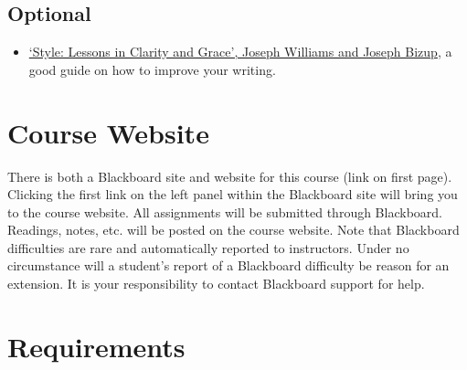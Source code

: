 \documentclass[article,oneside]{memoir}
\begin{document}
\subsection{Optional}

\begin{itemize}

\item \href{http://www.amazon.com/Style-Lessons-Clarity-Grace-11th/dp/0321898680/ref=sr_1_1?ie=UTF8&qid=1452356026&sr=8-1&keywords=lessons+in+clarity+and+grace}{`Style: Lessons in Clarity and Grace', Joseph Williams and Joseph Bizup}, a good guide on how to improve your writing. 
\end{itemize}
\section{Course Website}
There is both a Blackboard site and website for this course (link on first page). Clicking the first link on the left panel within the Blackboard site will bring you to the course website. All assignments will be submitted through Blackboard. Readings, notes, etc. will be posted on the course website. Note that Blackboard difficulties are rare and automatically reported to instructors. Under no circumstance will a student's report of a Blackboard difficulty be reason for an extension. It is your responsibility to contact Blackboard support for help.


\section{Requirements}
\end{document}
